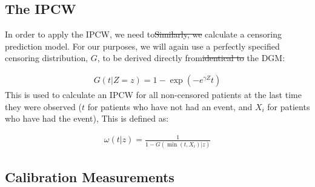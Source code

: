 \documentclass[
]{article}
\begin{document}
\hypertarget{the-ipcw}{%
\subsection{The IPCW}\label{the-ipcw}}

In order to apply the IPCW, we need to\sout{Similarly, we} calculate a censoring prediction model. For our purposes, we will again use a perfectly specified censoring distribution, \(G\), to be derived directly from\sout{identical to} the DGM:

\[
\begin{array}{c}
G(t|Z=z) = 1-\exp\left(-e^{\gamma Z}t\right)
\end{array}
\]
This is used to calculate an IPCW for all non-censored patients at the last time they were observed (\(t\) for patients who have not had an event, and \(X_i\) for patients who have had the event), This is defined as:

\[
\begin{array}{c}
\omega(t|z) = \frac{1}{1 - G(\min(t,X_i)|z)}
\end{array}
\]

\hypertarget{calibration-measurements}{%
\subsection{Calibration Measurements}\label{calibration-measurements}}
\end{document}
